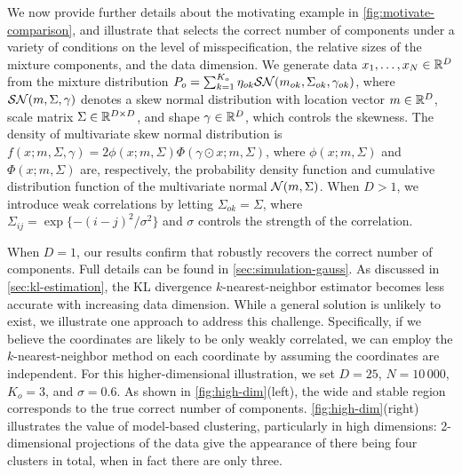 We now provide further details about the motivating example in \cref{fig:motivate-comparison}, and illustrate
that \methodname selects the correct number of components under a variety of conditions on the level of misspecification,
the relative sizes of the mixture components, and the data dimension.
We generate data $x_1, \ldots,x_{N} \in \mathbb{R}^{D}$ from the mixture distribution
$P_{o} = \sum_{k=1}^{K_{o}}\eta_{ok}\mathcal{SN}(m_{ok}, \Sigma_{ok}, \gamma_{ok})$,
where $\mathcal{SN}(m, \Sigma, \gamma)$ denotes a skew normal distribution with location vector $m \in \mathbb{R}^{D}$, scale matrix $\Sigma \in \mathbb{R}^{D \times D}$,
and shape $\gamma \in \mathbb{R}^{D}$, which controls the skewness.
The density of multivariate skew normal distribution is $f(x; m, \Sigma, \gamma) = 2\phi(x; m, \Sigma)\Phi(\gamma \odot x; m, \Sigma)$, where $\phi(x; m, \Sigma)$ and $\Phi(x; m, \Sigma)$ are, respectively, the probability density function
and cumulative distribution function of the multivariate normal $\mathcal{N}(m, \Sigma)$.
When $D > 1$, we introduce weak correlations by letting $\Sigma_{ok} = \Sigma$,
where $\Sigma_{ij}=\exp\{-(i-j)^2/\sigma^2\}$ and $\sigma$ controls the strength of the correlation.

When $D = 1$, our results confirm that \methodname robustly recovers the correct number of components.
Full details can be found in \cref{sec:simulation-gauss}.
As discussed in \cref{sec:kl-estimation}, the KL divergence $k$-nearest-neighbor estimator becomes less accurate with increasing data dimension.
While a general solution is unlikely to exist, we illustrate one approach to address this challenge.
Specifically, if we believe the coordinates are likely to be only weakly correlated, we can employ the $k$-nearest-neighbor
method on each coordinate by assuming the coordinates are independent.
For this higher-dimensional illustration, we set $D = 25$, $N=10\,000$, $K_{o}=3$, and $\sigma=0.6$.
As shown in \cref{fig:high-dim}(left), the wide and stable region corresponds to the true correct number of components.
\cref{fig:high-dim}(right) illustrates the value of model-based clustering, particularly in high dimensions: 2-dimensional
projections of the data give the appearance of there being four clusters in total, when in fact there are only three.

